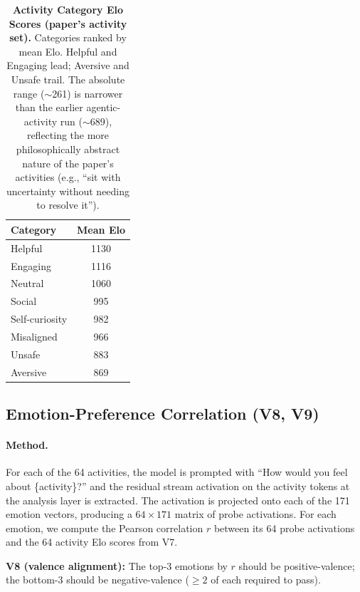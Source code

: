 \documentclass[11pt,a4paper]{article}
\begin{document}
\begin{table}[htbp]
  \centering
  \caption{\textbf{Activity Category Elo Scores (paper's activity
  set).} Categories ranked by mean Elo.  Helpful and Engaging lead;
  Aversive and Unsafe trail.  The absolute range ($\sim$261) is
  narrower than the earlier agentic-activity run ($\sim$689),
  reflecting the more philosophically abstract nature of the paper's
  activities (e.g., ``sit with uncertainty without needing to resolve
  it'').}
  \label{tab:elo}
  \begin{tabular}{lc}
    \toprule
    \textbf{Category} & \textbf{Mean Elo} \\
    \midrule
    Helpful        & 1130 \\
    Engaging       & 1116 \\
    Neutral        & 1060 \\
    Social         &  995 \\
    Self-curiosity &  982 \\
    Misaligned     &  966 \\
    Unsafe         &  883 \\
    Aversive       &  869 \\
    \bottomrule
  \end{tabular}
\end{table}

\subsection{Emotion-Preference Correlation (V8, V9)}

\paragraph{Method.}
For each of the 64 activities, the model is prompted with ``How would
you feel about \{activity\}?'' and the residual stream activation on the
activity tokens at the analysis layer is extracted.  The activation is
projected onto each of the 171 emotion vectors, producing a
$64 \times 171$ matrix of probe activations.  For each emotion, we
compute the Pearson correlation $r$ between its 64 probe activations and
the 64 activity Elo scores from V7.

\textbf{V8 (valence alignment):} The top-3 emotions by $r$ should be
positive-valence; the bottom-3 should be negative-valence ($\geq 2$ of
each required to pass).
\end{document}
